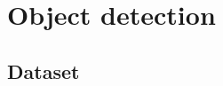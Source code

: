 \documentclass[thesis.tex]{subfiles}
\begin{document}
\chapter{Object detection}

\section{Dataset}

\subbibliography
\end{document}

